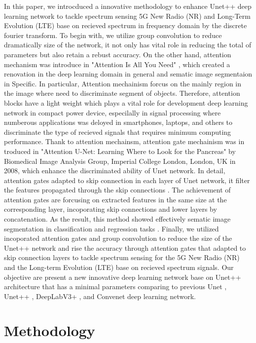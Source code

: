 \documentclass[journal]{IEEEtran} %
\begin{document}
In this paper, we introcduced a innovative methodology to enhance Unet++ deep learning network to tackle spectrum sensing 5G New Radio (NR) and Long-Term Evolution (LTE) base on recieved spectrum in frequency domain by the discrete fourier transform. To begin with, we utilize group convolution \cite{b9} to reduce dramatically size of the network, it not only has vital role in reducing the total of parameters but also retain a rebust accuracy. On the other hand, attention mechanism was introduce in "Attention Is All You Need" \cite{b4}, which created a renovation in the deep learning domain in general and sematic image segmentaion in Specific. In particular, Attention mechainism forcus on the mainly region in the image where need to discriminate segment of objects. Therefore, attention blocks have a light weight which plays a vital role for development deep learning network in compact power device, especilally in signal processing where numberous applications was deloyed in smartphones, laptops, and others to discriminate the type of recieved signals that requires minimum computing performance. Thank to attention mechainsm, attention gate mechainism was in troduced in "Attention U-Net: Learning Where to Look for the Pancreas" \cite{b3} by Biomedical Image Analysis Group, Imperial College London, London, UK in 2008, which enhance the discriminated ability of Unet network. In detail, attention gates adapted to skip connection in each layer of Unet network, it filter the features propagated through the skip connections \cite{b3}. The achievement of attention gates are forcusing on extracted features in the same size at the corresponding layer, incoporating skip connections and lower layers by concatenation. As the result, this method showed effectively sematic image segmentation in classification and regression tasks \cite{b3}. Finally, we utilized incoporated attention gates and group convolution to reduce the size of the Unet++ network and rise the accuracy through attention gates that adapted to skip connection layers to tackle spectrum sensing for the 5G New Radio (NR) and the Long-term Evolution (LTE) base on recieved spectrum signals. Our objective are present a new innovative deep learning network base on Unet++ architecture that has a minimal parameters comparing to previous Unet \cite{b5}, Unet++ \cite{b6}, DeepLabV3+ \cite{b2}, and Convenet \cite{b1} deep learning network.


\section{Methodology}
\end{document}
